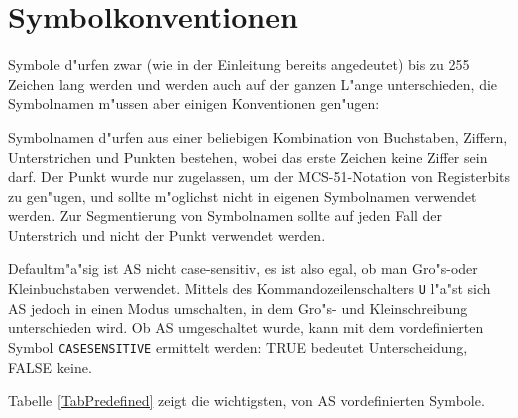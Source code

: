 \documentclass[12pt,a4paper,twoside]{report}
\newcommand{\tty}[1]{{\tt #1}}
\newcommand{\asname}{AS}
\begin{document}

\section{Symbolkonventionen}
\label{SectSymConv}

Symbole d"urfen zwar (wie in der Einleitung bereits angedeutet) bis zu
255 Zeichen lang werden und werden auch auf der ganzen L"ange
unterschieden, die Symbolnamen m"ussen aber einigen Konventionen
gen"ugen:
\par
Symbolnamen d"urfen aus einer beliebigen Kombination von Buchstaben,
Ziffern, Unterstrichen und Punkten bestehen, wobei das erste Zeichen
keine Ziffer sein darf.  Der Punkt wurde nur zugelassen, um der
MCS-51-Notation von Registerbits zu gen"ugen, und sollte m"oglichst nicht in
eigenen Symbolnamen verwendet werden.  Zur Segmentierung von Symbolnamen
sollte auf jeden Fall der Unterstrich und nicht der Punkt verwendet werden.
\par
Defaultm"a"sig ist \asname{} nicht case-sensitiv, es ist also egal, ob man
Gro"s-oder Kleinbuchstaben verwendet.  Mittels des Kommandozeilenschalters
\tty{U} l"a"st sich \asname{} jedoch in einen Modus umschalten, in dem Gro"s- und
Kleinschreibung unterschieden wird. Ob \asname{} umgeschaltet wurde, kann mit dem
vordefinierten Symbol \tty{CASESENSITIVE} ermittelt werden: TRUE bedeutet
Unterscheidung, FALSE keine.
\par
Tabelle \ref{TabPredefined} zeigt die wichtigsten, von \asname{} vordefinierten
Symbole.
\end{document}
